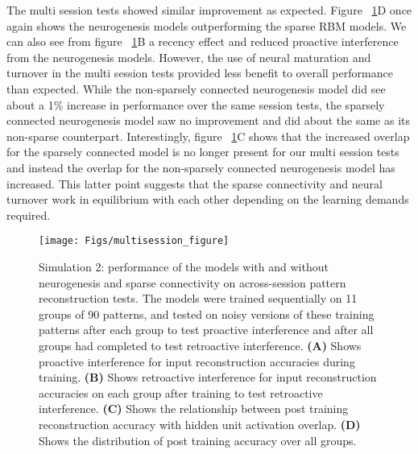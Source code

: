 The multi session tests showed similar improvement as expected. 
Figure ~\ref{fig:multisession_figure}D once again shows the neurogenesis 
models outperforming the sparse \ac{RBM} models. 
We can also see from figure ~\ref{fig:multisession_figure}B a 
recency effect and reduced proactive interference from the neurogenesis models. 
However, the use of neural maturation and turnover in the multi session 
tests provided less benefit to overall performance than expected. 
While the non-sparsely connected neurogenesis model did see about
a 1\% increase in performance over the same session tests, 
the sparsely connected neurogenesis model saw no improvement and 
did about the same as its non-sparse counterpart. 
Interestingly, figure ~\ref{fig:multisession_figure}C shows that the 
increased overlap for the sparsely connected model is no longer 
present for our multi session tests and instead the overlap for the non-sparsely 
connected neurogenesis model has increased. 
This latter point suggests that the sparse connectivity and neural turnover 
work in equilibrium with each other depending on the learning demands required. 

\begin{figure}[!h]
\begin{center}
\texttt{[image: Figs/multisession\_figure]}
\end{center}
\caption{ Simulation 2: performance of the models with and without neurogenesis and 
sparse connectivity on across-session pattern reconstruction tests. 
The models were trained sequentially on 11 groups of 90 patterns, and 
tested on noisy versions of these training patterns after each group to test 
proactive interference and after all groups had completed to test 
retroactive interference. 
\textbf{(A)} Shows proactive interference for input reconstruction accuracies during training. 
\textbf{(B)} Shows retroactive interference for input reconstruction accuracies on each 
group after training to test retroactive interference. 
\textbf{(C)} Shows the relationship between post training reconstruction accuracy with 
hidden unit activation overlap. 
\textbf{(D)} Shows the distribution of post training accuracy over all groups.}
\label{fig:multisession_figure}
\end{figure}

